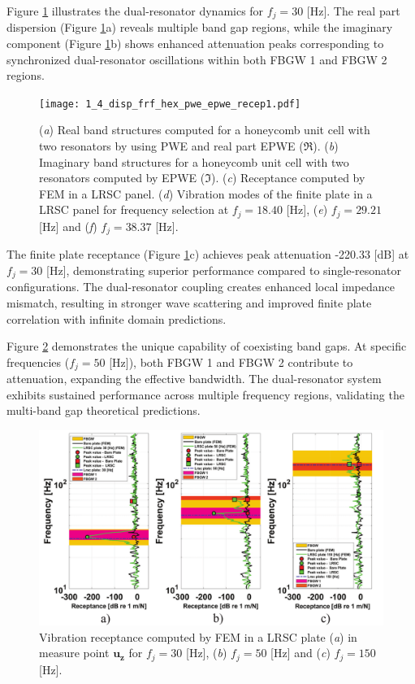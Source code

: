 \documentclass[review,numbers,sort&compress]{elsarticle}
\begin{document}
{Figure \ref{lat_h_pwe_epwe_tr_frf} illustrates the dual-resonator dynamics for $f_j = 30$ [Hz]. The real part dispersion (Figure \ref{lat_h_pwe_epwe_tr_frf}a) reveals multiple band gap regions, while the imaginary component (Figure \ref{lat_h_pwe_epwe_tr_frf}b) shows enhanced attenuation peaks corresponding to synchronized dual-resonator oscillations within both FBGW 1 and FBGW 2 regions.
\newpage
\begin{figure}[htb]
	\centering
	\texttt{[image: 1\_4\_disp\_frf\_hex\_pwe\_epwe\_recep1.pdf]}
	\caption{(\textit{a}) Real band structures computed for a honeycomb unit cell with two resonators by using PWE and real part EPWE ($\Re$). (\textit{b}) Imaginary band structures for a honeycomb unit cell with two resonators computed by EPWE ($\Im$). (\textit{c}) Receptance computed by FEM in a LRSC panel. (\textit{d}) Vibration modes of the finite plate in a LRSC panel for frequency selection at $f_j = 18.40$ [Hz], (\textit{e}) $f_j = 29.21$ [Hz] and (\textit{f}) $f_j = 38.37$ [Hz].}
	\label{lat_h_pwe_epwe_tr_frf}
\end{figure}

The finite plate receptance (Figure \ref{lat_h_pwe_epwe_tr_frf}c) achieves peak attenuation -220.33 [dB] at $f_j = 30$ [Hz], demonstrating superior performance compared to single-resonator configurations. The dual-resonator coupling creates enhanced local impedance mismatch, resulting in stronger wave scattering and improved finite plate correlation with infinite domain predictions.

Figure \ref{lat_h_tr_frf_f1_f2_f3} demonstrates the unique capability of coexisting band gaps. At specific frequencies ($f_j = 50$ [Hz]), both FBGW 1 and FBGW 2 contribute to attenuation, expanding the effective bandwidth. The dual-resonator system exhibits sustained performance across multiple frequency regions, validating the multi-band gap theoretical predictions.
\newpage
\begin{figure}[htb]
	\centering
	\includegraphics[width=1.0\textwidth]{2_4_disp_frf_hex_3_receps.pdf}
	\caption{Vibration receptance computed by FEM in a LRSC plate (\textit{a}) in measure point $\mathbf{u_z}$  for $f_j = 30$ [Hz], (\textit{b}) $f_j = 50$ [Hz] and (\textit{c}) $f_j = 150$ [Hz].}
	\label{lat_h_tr_frf_f1_f2_f3}
\end{figure}

}
\end{document}
